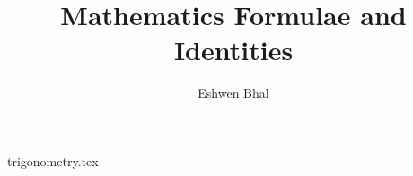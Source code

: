\documentclass[a4paper,12pt,openright]{report}
\title{Mathematics Formulae and Identities}
\author{Eshwen Bhal}
\begin{document}
\maketitle

\clearpage


\tableofcontents
{}

\clearemptydoublepage


{trigonometry.tex}
\clearemptydoublepage
\end{document}
